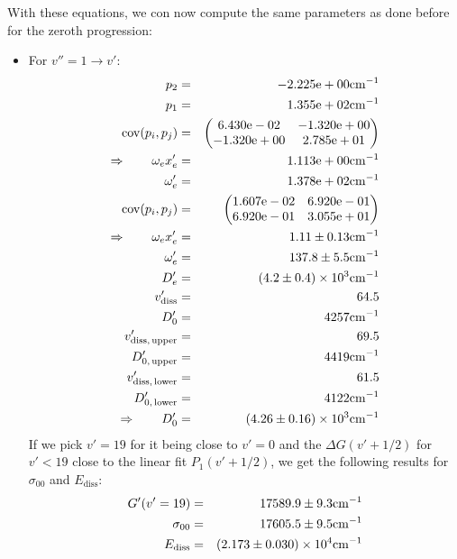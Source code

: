 With these equations, we con now compute the same parameters as done before for the 
zeroth progression:
\begin{itemize}
    \item For $v'' = 1 \rightarrow v'$:
        \begin{eqnarray}
            p_2 &=& -2.225\mathrm{e}+00 \mathrm{cm^{-1}} \nonumber \\
            p_1 &=& 1.355\mathrm{e}+02 \mathrm{cm^{-1}} \nonumber \\
            \mathrm{cov}(p_i, p_j) &=& 
            \begin{pmatrix}
                6.430\mathrm{e}-02 &-1.320\mathrm{e}+00 \\
                -1.320\mathrm{e}+00 &2.785\mathrm{e}+01 \\
            \end{pmatrix}
            \\ \Rightarrow \qquad
            \omega_e x_e' &=& 1.113\mathrm{e}+00 \mathrm{cm^{-1}} \nonumber \\
            \omega_e' &=& 1.378\mathrm{e}+02 \mathrm{cm^{-1}} \nonumber \\
            \mathrm{cov}(p_i, p_j) &=& 
            \begin{pmatrix}
                1.607\mathrm{e}-02 &6.920\mathrm{e}-01 \\
                6.920\mathrm{e}-01 &3.055\mathrm{e}+01 \\
            \end{pmatrix}
            \\ \Rightarrow \qquad
            \omega_e x_e' &=& 1.11 \pm 0.13 \mathrm{cm^{-1}}\\
            \omega_e' &=& 137.8 \pm 5.5 \mathrm{cm^{-1}} \\
            D_e' &=& \left(4.2 \pm 0.4\right) \times 10^{3} \mathrm{cm^{-1}} \\
            v_\mathrm{diss}' &=& 64.5 \\
            D_0' &=& 4257 \mathrm{cm^{-1}} \\
            v_\mathrm{diss,\, upper}' &=& 69.5 \\
            D_{0,\, \mathrm{upper}}' &=& 4419 \mathrm{cm^{-1}}\\
            v_\mathrm{diss,\, lower}' &=& 61.5 \\
            D_{0,\, \mathrm{lower}}' &=& 4122 \mathrm{cm^{-1}} \\
            \Rightarrow \qquad
            D_0' &=& \left(4.26 \pm 0.16\right) \times 10^{3} \mathrm{cm^{-1}}
        \end{eqnarray}
        If we pick $v' = 19$ for it being close to $v' = 0$ and the $\Delta G(v' + 1/2)$ 
        for $v' < 19$ close to the linear fit $P_1(v' + 1/2)$, we get the following results for 
        $\sigma_{00}$ and $E_\mathrm{diss}$:
        \begin{eqnarray}
            G'(v' = 19) &=& 17589.9 \pm 9.3 \mathrm{cm^{-1}} \\
            \sigma_{00} &=& 17605.5 \pm 9.5 \mathrm{cm^{-1}} \\
            E_\mathrm{diss} &=& \left(2.173 \pm 0.030\right) \times 10^{4} \mathrm{cm^{-1}}
        \end{eqnarray}
    \end{itemize}
